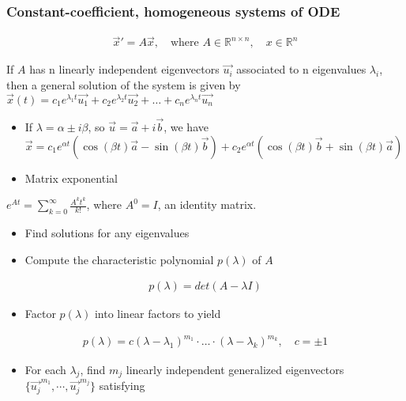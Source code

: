 \documentclass[12pt]{article}
\begin{document}
\subsubsection*{Constant-coefficient, homogeneous systems of ODE}
\label{sec:orgbddd9e7}
\begin{align*}
	\vec{x}' = A \vec{x}, \quad \text{where } A\in\mathbb{R}^{n\times n},\quad x\in\mathbb{R}^n
\end{align*}

If \(A\) has n linearly independent eigenvectors \(\vec{u_i}\) associated to n
eigenvalues \(\lambda_i\), then a general solution of the system is given by
\(\vec{x}(t) = c_1 e^{\lambda_1 t}\vec{u_1}+c_2e^{\lambda_2t}\vec{u_2} + \ldots + c_ne^{\lambda_nt}\vec{u_n}\)

\begin{itemize}
\item If \(\lambda=\alpha \pm i \beta\), so \(\vec{u}=\vec{a}+i\vec{b}\), we have
\(\vec{x}=c_1e^{\alpha t}(\cos(\beta t)\vec{a}-\sin(\beta t)\vec{b}) +
  c_2e^{\alpha t}(\cos(\beta t)\vec{b}+\sin(\beta t)\vec{a})\)

\item Matrix exponential
\end{itemize}

\(e^{At} = \sum_{k=0}^{\infty} \frac{A^k t^k}{k!}\), where \(A^0=I\), an
identity matrix.

\begin{itemize}
\item Find solutions for any eigenvalues

\item Compute the characteristic polynomial \(p(\lambda)\) of \(A\)
\end{itemize}

\begin{align*}
	p(\lambda)=det(A-\lambda I)
\end{align*}

\begin{itemize}
\item Factor \(p(\lambda)\) into linear factors to yield
\end{itemize}

\begin{align*}
	p(\lambda) = c(\lambda-\lambda_1)^{m_1} \cdot \ldots \cdot (\lambda-\lambda_k)^{m_k},\quad c=\pm 1
\end{align*}

\begin{itemize}
\item For each \(\lambda_j\), find \(m_j\) linearly independent generalized eigenvectors
\(\{\vec{u_j}^{m_1},\cdots,\vec{u_j}^{m_j}\}\) satisfying
\end{itemize}
\end{document}
